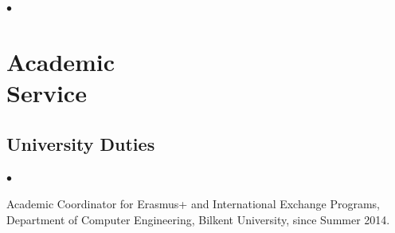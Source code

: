 \documentclass[margin,line]{res}
\newenvironment{list2}{
  \begin{list}{$\bullet$}{%
      \setlength{\itemsep}{0in}
      \setlength{\parsep}{0in} \setlength{\parskip}{0in}
      \setlength{\topsep}{0in} \setlength{\partopsep}{0in} 
      \setlength{\leftmargin}{0.2in}}}{\end{list}}
\begin{document}
\begin{resume}
\begin{list2}
  
\end{list2}

\vspace*{-.2cm}
\section{\sc Academic \\ Service}
\vspace{-0.3cm}
\subsection{\small \sc University Duties}
\begin{list2}
\item
  Academic Coordinator for Erasmus+ and International Exchange Programs, Department of Computer Engineering, Bilkent University, since Summer 2014.
\end{list2}
\vspace{-0.6cm}


\end{resume}
\end{document}
